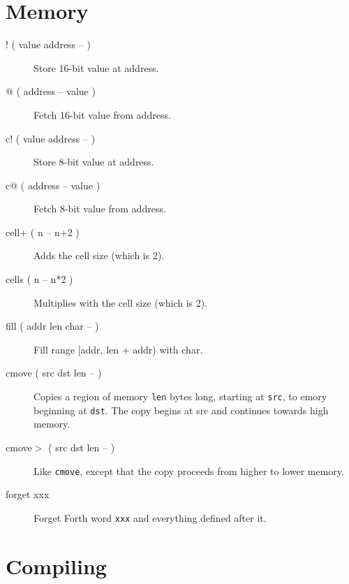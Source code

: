 \section{Memory}

\begin{description}
\item[! ( value address -- )] Store 16-bit value at address.  
\item[@ ( address -- value )] Fetch 16-bit value from address.  
\item[c! ( value address -- )] Store 8-bit value at address.  
\item[c@ ( address -- value )] Fetch 8-bit value from address.
\item[cell+ ( n -- n+2 )] Adds the cell size (which is 2).
\item[cells ( n -- n*2 )] Multiplies with the cell size (which is 2).
\item[fill ( addr len char -- )] Fill range [addr, len + addr) with char.
\item[cmove ( src dst len -- )]
Copies a region of memory \texttt{len} bytes long, starting at \texttt{src}, to emory beginning at \texttt{dst}. The copy begins at src and continues towards high memory.
\item[cmove$>$ ( src dst len -- )]
Like \texttt{cmove}, except that the copy proceeds from higher to lower memory.
\item[forget xxx] Forget Forth word \texttt{xxx} and everything defined after it.

\end{description}
\section{Compiling}

